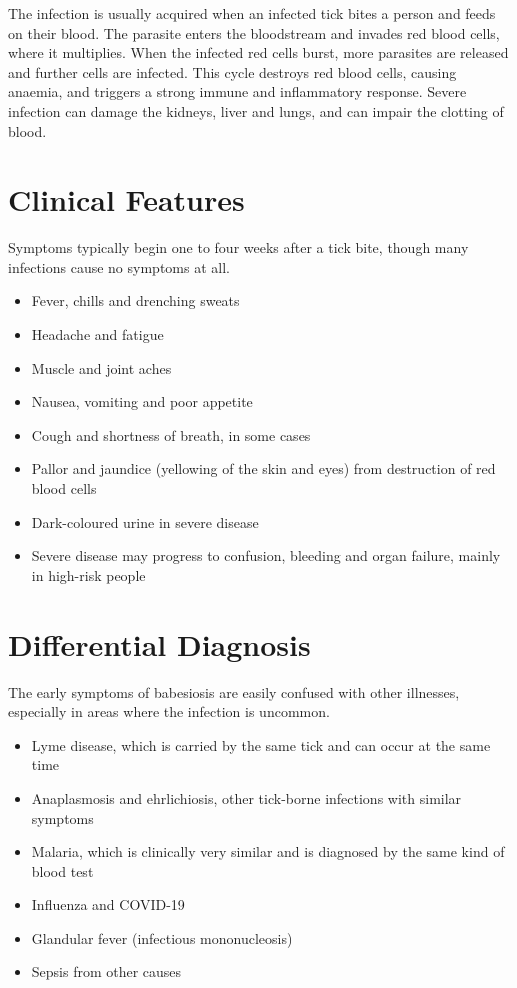 The infection is usually acquired when an infected tick bites a person and feeds on their blood. The parasite enters the bloodstream and invades red blood cells, where it multiplies. When the infected red cells burst, more parasites are released and further cells are infected. This cycle destroys red blood cells, causing anaemia, and triggers a strong immune and inflammatory response. Severe infection can damage the kidneys, liver and lungs, and can impair the clotting of blood.

\section*{Clinical Features}
Symptoms typically begin one to four weeks after a tick bite, though many infections cause no symptoms at all.

\begin{itemize}
    \item Fever, chills and drenching sweats
    \item Headache and fatigue
    \item Muscle and joint aches
    \item Nausea, vomiting and poor appetite
    \item Cough and shortness of breath, in some cases
    \item Pallor and jaundice (yellowing of the skin and eyes) from destruction of red blood cells
    \item Dark-coloured urine in severe disease
    \item Severe disease may progress to confusion, bleeding and organ failure, mainly in high-risk people
\end{itemize}

\section*{Differential Diagnosis}
The early symptoms of babesiosis are easily confused with other illnesses, especially in areas where the infection is uncommon.

\begin{itemize}
    \item Lyme disease, which is carried by the same tick and can occur at the same time
    \item Anaplasmosis and ehrlichiosis, other tick-borne infections with similar symptoms
    \item Malaria, which is clinically very similar and is diagnosed by the same kind of blood test
    \item Influenza and COVID-19
    \item Glandular fever (infectious mononucleosis)
    \item Sepsis from other causes
\end{itemize}


